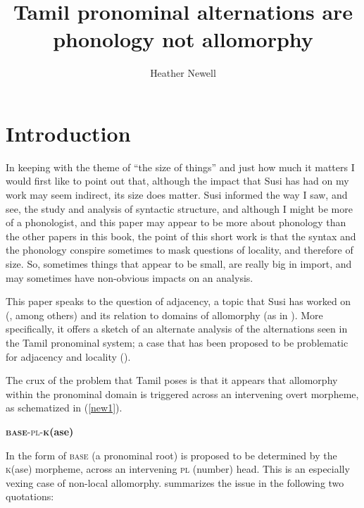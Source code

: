 \documentclass[output=paper]{langscibook}
\author{Heather Newell\affiliation{Université du Québec à Montréal}}
\title{Tamil pronominal alternations are phonology not allomorphy}
\begin{document}
\maketitle
\section{Introduction}

In keeping with the theme of “the size of things” and just how much it matters I would first like to point out that, although the impact that Susi has had on my work may seem indirect, its size does matter. Susi informed the way I saw, and see, the study and analysis of syntactic structure, and although I might be more of a phonologist, and this paper may appear to be more about phonology than the other papers in this book, the point of this short work is that the syntax and the phonology conspire sometimes to mask questions of locality, and therefore of size. So, sometimes things that appear to be small, are really big in import, and may sometimes have non-obvious impacts on an analysis.  

This paper speaks to the question of adjacency, a topic that Susi has worked on (\citealt{BobaljikWurmbrand2005newell,Wurmbrand2007newell}, among others) and its relation to domains of allomorphy (as in \citealt{BobaljikWurmbrand2013}). More specifically, it offers a sketch of an alternate analysis of the alternations seen in the Tamil pronominal system; a case that has been proposed to be problematic for adjacency and locality (\citealt{Moskal2015,moskal2016towards}). 

\begin{sloppypar}
The crux of the problem that Tamil poses is that it appears that allomorphy within the pronominal domain is triggered across an intervening overt morpheme, as schematized in (\ref{new1}).
\end{sloppypar}

\begin{exe}
\ex \label{new1}
 \textsc{\textbf{base}-pl-\textbf{k}}\textbf{(ase)}
\end{exe}

In  the form of \textsc{base} (a pronominal root) is proposed to be determined by the \textsc{k}(ase) morpheme, across an intervening \textsc{pl} (number) head. This is an especially vexing case of non-local allomorphy. \citeauthor{Moskal2015} summarizes the issue in the following two quotations:
\end{document}
